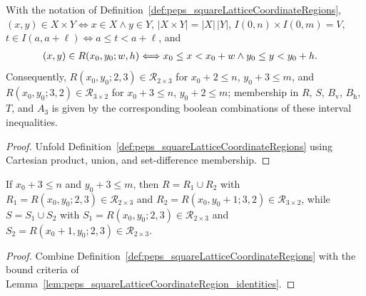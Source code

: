 \begin{lemma}%
    \label{lem:peps_squareLatticeCoordinateRegion_identities}
    \leanok
    With the notation of Definition~\ref{def:peps_squareLatticeCoordinateRegions},
    $(x,y)\in X\times Y\Longleftrightarrow x\in X\wedge y\in Y$,
    $|X\times Y|=|X|\,|Y|$, $I(0,n)\times I(0,m)=V$,
    $t\in I(a,a+\ell)\Longleftrightarrow a\le t<a+\ell$, and
    \begin{align}
        (x,y)\in R(x_0,y_0;w,h)
         & \Longleftrightarrow
        x_0\le x<x_0+w\wedge y_0\le y<y_0+h.
        \notag
    \end{align}
    Consequently, $R(x_0,y_0;2,3)\in\mathcal R_{2\times 3}$ for $x_0+2\le n$,
    $y_0+3\le m$, and $R(x_0,y_0;3,2)\in\mathcal R_{3\times 2}$ for
    $x_0+3\le n$, $y_0+2\le m$; membership in $R$, $S$, $B_{\mathrm v}$,
    $B_{\mathrm h}$, $T$, and $A_3$ is given by the corresponding boolean
    combinations of these interval inequalities.
\end{lemma}
\begin{proof}\leanok
    Unfold Definition~\ref{def:peps_squareLatticeCoordinateRegions} using
    Cartesian product, union, and set-difference membership.
\end{proof}

\begin{lemma}%
    \label{lem:peps_normalSquareRegionRS_rectangular_decomposition}
    \leanok
    If $x_0+3\le n$ and $y_0+3\le m$, then
    $R=R_1\cup R_2$ with $R_1=R(x_0,y_0;2,3)\in\mathcal R_{2\times 3}$ and
    $R_2=R(x_0,y_0+1;3,2)\in\mathcal R_{3\times 2}$, while
    $S=S_1\cup S_2$ with $S_1=R(x_0,y_0;2,3)\in\mathcal R_{2\times 3}$ and
    $S_2=R(x_0+1,y_0;2,3)\in\mathcal R_{2\times 3}$.
\end{lemma}
\begin{proof}\leanok
    Combine Definition~\ref{def:peps_squareLatticeCoordinateRegions} with the
    bound criteria of Lemma~\ref{lem:peps_squareLatticeCoordinateRegion_identities}.
\end{proof}

